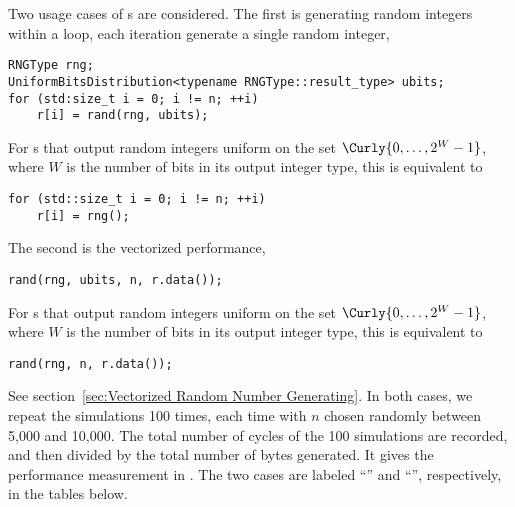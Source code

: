 Two usage cases of \rng{}s are considered. The first is generating random
integers within a loop, each iteration generate a single random integer,
\begin{verbatim}
RNGType rng;
UniformBitsDistribution<typename RNGType::result_type> ubits;
for (std:size_t i = 0; i != n; ++i)
    r[i] = rand(rng, ubits);
\end{verbatim}
For \rng{}s that output random integers uniform on the set $\Curly{0,\dots,2^W
  - 1}$, where $W$ is the number of bits in its output integer type, this is
equivalent to
\begin{verbatim}
for (std::size_t i = 0; i != n; ++i)
    r[i] = rng();
\end{verbatim}
The second is the vectorized performance,
\begin{verbatim}
rand(rng, ubits, n, r.data());
\end{verbatim}
For \rng{}s that output random integers uniform on the set $\Curly{0,\dots,2^W
  - 1}$, where $W$ is the number of bits in its output integer type, this is
equivalent to
\begin{verbatim}
rand(rng, n, r.data());
\end{verbatim}
See section~\ref{sec:Vectorized Random Number Generating}. In both cases, we
repeat the simulations 100 times, each time with $n$ chosen randomly between
5,000 and 10,000. The total number of cycles of the 100 simulations are
recorded, and then divided by the total number of bytes generated. It gives the
performance measurement in \cpb. The two cases are labeled ``\single'' and
``\batch'', respectively, in the tables below.







